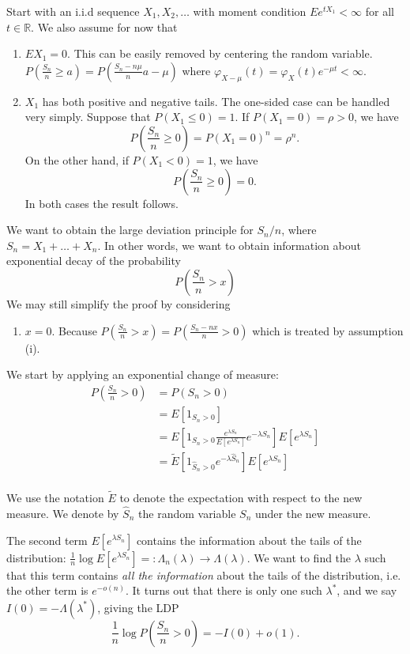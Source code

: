 Start with an i.i.d sequence $X_1, X_2, \ldots$ with moment condition $E e^{t X_1} < \infty$ for all $t \in \mathbb{R}$. We also assume for now that
\begin{enumerate}
    \item $E X_1 = 0$. This can be easily removed by centering the random variable. $P\left( \frac{S_n}{n} \ge a \right) = P\left( \frac{S_n - n \mu}{n} a - \mu \right) $ where $\varphi_{X - \mu}(t) = \varphi_X(t) e^{- \mu t} < \infty $.
    \item $X_1$ has both positive and negative tails. The one-sided case can be handled very simply. Suppose that $P(X_1 \le 0) = 1$. If $P(X_1 = 0) = \rho > 0$, we have
	    \[
	    	P\left( \frac{S_n}{n} \ge 0 \right)  = P(X_1 = 0)^n = \rho^n
	    .\] 
	    On the other hand, if $P(X_1 < 0) = 1$, we have
	     \[
	    	P\left( \frac{S_n}{n}\ge 0 \right)  = 0
	    .\] 
	    In both cases the result follows.
\end{enumerate}
We want to obtain the large deviation principle for $S_n / n$, where $S_n = X_1 + \ldots + X_n$. In other words, we want to obtain information about exponential decay of the probability
\[
    P\left( \frac{S_n}{n} > x \right)
\]
We may still simplify the proof by considering 
\begin{enumerate}[resume]
    \item $x = 0$. Because $P(\frac{S_n}{n}>x) = P\left( \frac{S_n - n x }{n} > 0 \right) $ which is treated by assumption (i).
\end{enumerate}

We start by applying an exponential change of measure:
\begin{align*}
    P\left( \frac{S_n}{n} > 0 \right) &= P\left( S_n > 0 \right) \\
    &= E\left[ 1_{S_n > 0} \right] \\
    &= E\left[ 1_{S_n > 0} \frac{e^{\lambda S_n}}{ E \left[ e^{\lambda S_n} \right]} e^{-\lambda S_n} \right] E \left[ e^{\lambda S_n} \right] \\
    &= \tilde E \left[ 1_{\hat S_n > 0} e^{-\lambda \hat S_n} \right] E \left[ e^{\lambda S_n} \right] \\
\end{align*}

We use the notation $\tilde E$ to denote the expectation with respect to the new measure. We denote by $\hat S_n$ the random variable $S_n$ under the new measure. 

The second term $E \left[ e^{\lambda S_n} \right]$ contains the information about the tails of the distribution: $\frac{1}{n} \log E \left[ e^{\lambda S_n} \right] =: \Lambda_n(\lambda) \to \Lambda(\lambda)$. We want to find the $\lambda$ such that this term contains \textit{all the information} about the tails of the distribution, i.e. the other term is $e^{- o(n)}$. It turns out that there is only one such $\lambda^*$, and we say $I(0) = -\Lambda(\lambda^*)$, giving the LDP 
\[
    \frac{1}{n} \log P\left( \frac{S_n}{n} > 0 \right) = - I(0) + o(1).
\]

